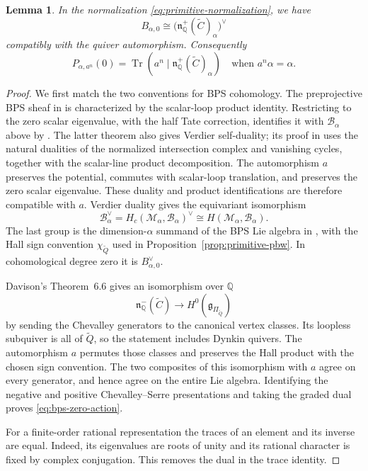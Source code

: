 \documentclass[11pt, reqno]{amsart}
\numberwithin{equation}{section}
\newtheorem{lemma}[theorem]{Lemma}
\theoremstyle{definition}
\theoremstyle{remark}
\newcommand{\op}[1]{\operatorname{#1}}
\newcommand{\mb}[1]{\mathbb{#1}}
\newcommand{\mc}[1]{\mathcal{#1}}
\newcommand{\ms}[1]{\mathscr{#1}}
\newcommand{\Tr}{\op{Tr}}
\newcommand{\Qbar}{\widetilde Q}
\newcommand{\iso}{\cong}
\begin{document}
\begin{lemma}\label{lem:bps-zero-action}
In the normalization \eqref{eq:primitive-normalization}, we have
\begin{equation}\label{eq:bps-zero-action} B_{\alpha,0}\iso \bigl(\mathfrak n_{\mb Q}^+(\widetilde C)_\alpha\bigr)^\vee\end{equation}
compatibly with the quiver automorphism. Consequently
\[ P_{\alpha,a^n}(0) =\Tr(a^n\mid\mathfrak n_{\mb Q}^+(\widetilde C)_\alpha) \quad\text{when }a^n\alpha=\alpha. \]
\end{lemma}
\begin{proof}
We first match the two conventions for BPS cohomology. The
preprojective BPS sheaf in
\cite[Theorem/Definition~4.1, equations~(40)--(41)]{DavisonBPS}
is characterized by the scalar-loop product identity. Restricting
to the zero scalar eigenvalue, with the half Tate correction,
identifies it with $\ms B_\alpha$ above by
\cite[Theorem~B, equation~(7)]{DavisonStacks}.
The latter theorem also gives Verdier self-duality; its proof in
\cite[Section~4.2, equation~(43)]{DavisonStacks} uses the natural
dualities of the normalized intersection complex and vanishing
cycles, together with the scalar-line product decomposition.
The automorphism $a$ preserves the potential, commutes with
scalar-loop translation, and preserves the zero scalar eigenvalue.
These duality and product identifications are therefore compatible
with $a$. Verdier duality gives the equivariant isomorphism
\[ \mc B_\alpha^\vee
   =H_c(\mc M_\alpha,\ms B_\alpha)^\vee
   \iso H(\mc M_\alpha,\ms B_\alpha). \]
The last group is the dimension-$\alpha$ summand of the BPS Lie
algebra in \cite[Definition~4.2]{DavisonBPS}, with the Hall sign
convention $\chi_{\Qbar}$ used in
Proposition~\ref{prop:primitive-pbw}. In cohomological degree zero
it is $B_{\alpha,0}^{\vee}$.

Davison's Theorem~6.6 gives an isomorphism over $\mb Q$
\[ \mathfrak n_{\mb Q}^-(\widetilde C) \longrightarrow H^0(\mathfrak g_{\Pi_{\Qbar}}) \]
by sending the Chevalley generators to the canonical vertex classes.
Its loopless subquiver is all of $\Qbar$, so the statement includes
Dynkin quivers. The automorphism $a$ permutes those classes and
preserves the Hall product with the chosen sign convention. The two
composites of this isomorphism with $a$ agree on every generator,
and hence agree on the entire Lie algebra. Identifying the negative
and positive Chevalley--Serre presentations and taking the graded
dual proves \eqref{eq:bps-zero-action}.

For a finite-order rational representation the traces of an element
and its inverse are equal. Indeed, its eigenvalues are roots of unity
and its rational character is fixed by complex conjugation. This
removes the dual in the trace identity.
\end{proof}
\end{document}
